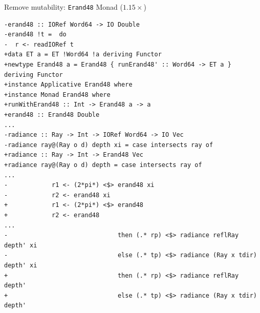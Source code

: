 \documentclass[8pt]{beamer}
\begin{document}
\begin{frame}[fragile]{Remove mutability: \texttt{Erand48} Monad ($1.15\times$)}


\begin{verbatim}
-erand48 :: IORef Word64 -> IO Double
-erand48 !t =  do
-  r <- readIORef t
+data ET a = ET !Word64 !a deriving Functor
+newtype Erand48 a = Erand48 { runErand48' :: Word64 -> ET a } deriving Functor
+instance Applicative Erand48 where
+instance Monad Erand48 where
+runWithErand48 :: Int -> Erand48 a -> a                                                                                                
+erand48 :: Erand48 Double
...
-radiance :: Ray -> Int -> IORef Word64 -> IO Vec
-radiance ray@(Ray o d) depth xi = case intersects ray of
+radiance :: Ray -> Int -> Erand48 Vec
+radiance ray@(Ray o d) depth = case intersects ray of
...
-            r1 <- (2*pi*) <$> erand48 xi
-            r2 <- erand48 xi
+            r1 <- (2*pi*) <$> erand48
+            r2 <- erand48
...
-                              then (.* rp) <$> radiance reflRay depth' xi
-                              else (.* tp) <$> radiance (Ray x tdir) depth' xi
+                              then (.* rp) <$> radiance reflRay depth'
+                              else (.* tp) <$> radiance (Ray x tdir) depth'
\end{verbatim}


\end{frame}
\end{document}
